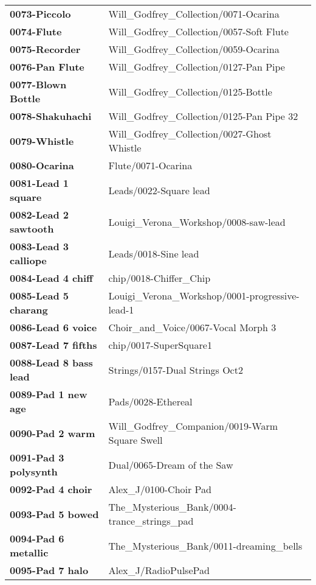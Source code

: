 \begin{longtable}{|l l|}
   \textbf{0073-Piccolo} &
      Will\_Godfrey\_Collection/0071-Ocarina \\
   \textbf{0074-Flute} &
      Will\_Godfrey\_Collection/0057-Soft Flute \\
   \textbf{0075-Recorder} &
      Will\_Godfrey\_Collection/0059-Ocarina \\
   \textbf{0076-Pan Flute} &
      Will\_Godfrey\_Collection/0127-Pan Pipe \\
   \textbf{0077-Blown Bottle} &
      Will\_Godfrey\_Collection/0125-Bottle \\
   \textbf{0078-Shakuhachi} &
      Will\_Godfrey\_Collection/0125-Pan Pipe 32 \\
   \textbf{0079-Whistle} &
      Will\_Godfrey\_Collection/0027-Ghost Whistle \\
   \textbf{0080-Ocarina} &
      Flute/0071-Ocarina \\
   \textbf{0081-Lead 1 square} &
      Leads/0022-Square lead \\
   \textbf{0082-Lead 2 sawtooth} &
      Louigi\_Verona\_Workshop/0008-saw-lead \\
   \textbf{0083-Lead 3 calliope} &
      Leads/0018-Sine lead \\
   \textbf{0084-Lead 4 chiff} &
      chip/0018-Chiffer\_Chip \\
   \textbf{0085-Lead 5 charang} &
      Louigi\_Verona\_Workshop/0001-progressive-lead-1 \\
   \textbf{0086-Lead 6 voice} &
      Choir\_and\_Voice/0067-Vocal Morph 3 \\
   \textbf{0087-Lead 7 fifths} &
      chip/0017-SuperSquare1 \\
   \textbf{0088-Lead 8 bass lead} &
      Strings/0157-Dual Strings Oct2 \\
   \textbf{0089-Pad 1 new age} &
      Pads/0028-Ethereal \\
   \textbf{0090-Pad 2 warm} &
      Will\_Godfrey\_Companion/0019-Warm Square Swell \\
   \textbf{0091-Pad 3 polysynth} &
      Dual/0065-Dream of the Saw \\
   \textbf{0092-Pad 4 choir} &
      Alex\_J/0100-Choir Pad \\
   \textbf{0093-Pad 5 bowed} &
      The\_Mysterious\_Bank/0004-trance\_strings\_pad \\
   \textbf{0094-Pad 6 metallic} &
      The\_Mysterious\_Bank/0011-dreaming\_bells \\
   \textbf{0095-Pad 7 halo} &
      Alex\_J/RadioPulsePad \\

\end{longtable}
